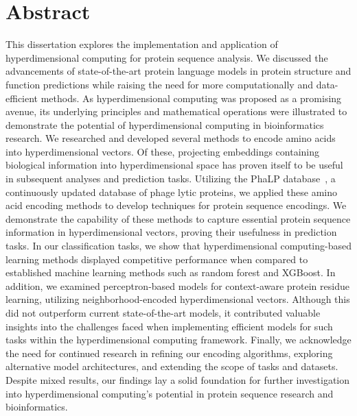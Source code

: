 \chapter{Abstract}
This dissertation explores the implementation and application of hyperdimensional computing for protein sequence analysis. We discussed the advancements of state-of-the-art protein language models in protein structure and function predictions while raising the need for more computationally and data-efficient methods. As hyperdimensional computing was proposed as a promising avenue, its underlying principles and mathematical operations were illustrated to demonstrate the potential of hyperdimensional computing in bioinformatics research. We researched and developed several methods to encode amino acids into hyperdimensional vectors. Of these, projecting embeddings containing biological information into hyperdimensional space has proven itself to be useful in subsequent analyses and prediction tasks. Utilizing the PhaLP database~\cite{phalp}, a continuously updated database of phage lytic proteins, we applied these amino acid encoding methods to develop techniques for protein sequence encodings. We demonstrate the capability of these methods to capture essential protein sequence information in hyperdimensional vectors, proving their usefulness in prediction tasks. In our classification tasks, we show that hyperdimensional computing-based learning methods displayed competitive performance when compared to established machine learning methods such as random forest and XGBoost. In addition, we examined perceptron-based models for context-aware protein residue learning, utilizing neighborhood-encoded hyperdimensional vectors. Although this did not outperform current state-of-the-art models, it contributed valuable insights into the challenges faced when implementing efficient models for such tasks within the hyperdimensional computing framework. Finally, we acknowledge the need for continued research in refining our encoding algorithms, exploring alternative model architectures, and extending the scope of tasks and datasets. Despite mixed results, our findings lay a solid foundation for further investigation into hyperdimensional computing's potential in protein sequence research and bioinformatics.